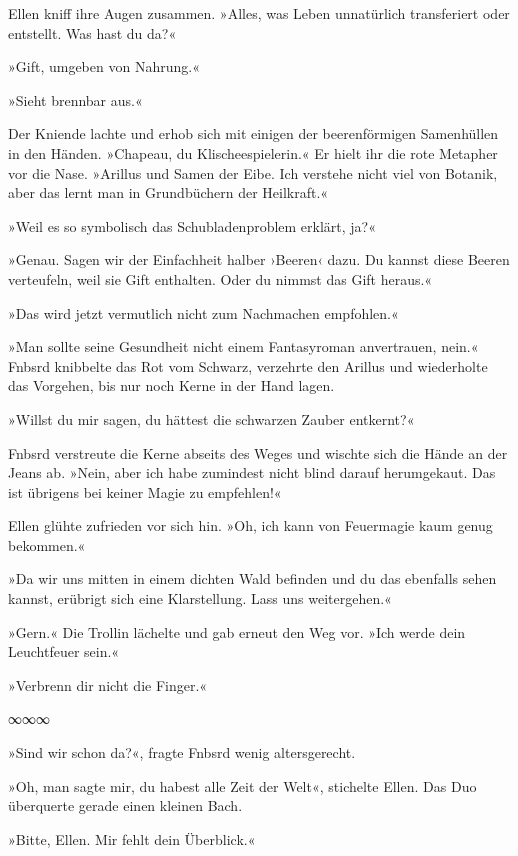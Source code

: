 Ellen kniff ihre Augen zusammen. »Alles, was Leben unnatürlich transferiert oder entstellt. Was hast du da?«

»Gift, umgeben von Nahrung.«

»Sieht brennbar aus.«

Der Kniende lachte und erhob sich mit einigen der beerenförmigen Samenhüllen in den Händen. »Chapeau, du Klischeespielerin.« Er hielt ihr die rote Metapher vor die Nase. »Arillus und Samen der Eibe. Ich verstehe nicht viel von Botanik, aber das lernt man in Grundbüchern der Heilkraft.«

»Weil es so symbolisch das Schubladenproblem erklärt, ja?«

»Genau. Sagen wir der Einfachheit halber ›Beeren‹ dazu. Du kannst diese Beeren verteufeln, weil sie Gift enthalten. Oder du nimmst das Gift heraus.«

»Das wird jetzt vermutlich nicht zum Nachmachen empfohlen.«

»Man sollte seine Gesundheit nicht einem Fantasyroman anvertrauen, nein.« Fnbsrd knibbelte das Rot vom Schwarz, verzehrte den Arillus und wiederholte das Vorgehen, bis nur noch Kerne in der Hand lagen.

»Willst du mir sagen, du hättest die schwarzen Zauber entkernt?«

Fnbsrd verstreute die Kerne abseits des Weges und wischte sich die Hände an der Jeans ab. »Nein, aber ich habe zumindest nicht blind darauf herumgekaut. Das ist übrigens bei keiner Magie zu empfehlen!«

Ellen glühte zufrieden vor sich hin. »Oh, ich kann von Feuermagie kaum genug bekommen.«

»Da wir uns mitten in einem dichten Wald befinden und du das ebenfalls sehen kannst, erübrigt sich eine Klarstellung. Lass uns weitergehen.«

»Gern.« Die Trollin lächelte und gab erneut den Weg vor. »Ich werde dein Leuchtfeuer sein.«

»Verbrenn dir nicht die Finger.«

\begin{center}
∞∞∞
\end{center}

»Sind wir schon da?«, fragte Fnbsrd wenig altersgerecht.

»Oh, man sagte mir, du habest alle Zeit der Welt«, stichelte Ellen. Das Duo überquerte gerade einen kleinen Bach.

»Bitte, Ellen. Mir fehlt dein Überblick.«

